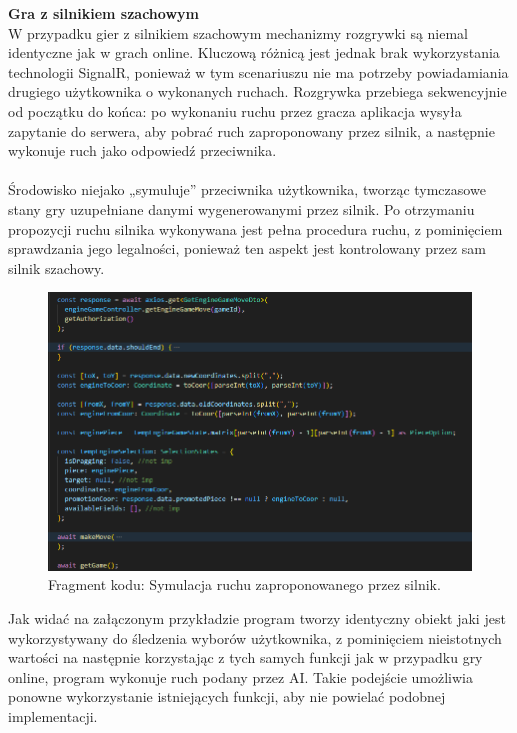 \documentclass[twoside]{projektInzynierskiMS1}
\begin{document}
\newpage

\noindent \textbf{Gra z silnikiem szachowym}\\
W przypadku gier z silnikiem szachowym mechanizmy rozgrywki są niemal identyczne jak w grach online. Kluczową różnicą jest jednak brak wykorzystania technologii SignalR, ponieważ w tym scenariuszu nie ma potrzeby powiadamiania drugiego użytkownika o wykonanych ruchach. Rozgrywka przebiega sekwencyjnie od początku do końca: po wykonaniu ruchu przez gracza aplikacja wysyła zapytanie do serwera, aby pobrać ruch zaproponowany przez silnik, a następnie wykonuje ruch jako odpowiedź przeciwnika.
\\\\
Środowisko niejako „symuluje” przeciwnika użytkownika, tworząc tymczasowe stany gry uzupełniane danymi wygenerowanymi przez silnik. Po otrzymaniu propozycji ruchu silnika wykonywana jest pełna procedura ruchu, z pominięciem sprawdzania jego legalności, ponieważ ten aspekt jest kontrolowany przez sam silnik szachowy.

\vspace{0.5cm}
\begin{figure}[h!]
    \centering
    \includegraphics[width=1\textwidth]{images/ex_engine_move_sim.png}
    \caption{Fragment kodu: Symulacja ruchu zaproponowanego przez silnik.}
\end{figure}
\vspace{0.5cm}

\noindent
Jak widać na załączonym przykładzie program tworzy identyczny obiekt jaki jest wykorzystywany do śledzenia wyborów użytkownika, z pominięciem nieistotnych wartości na następnie korzystając z tych samych funkcji jak w przypadku gry online, program wykonuje ruch podany przez AI. Takie podejście umożliwia ponowne wykorzystanie istniejących funkcji, aby nie powielać podobnej implementacji.
\end{document}
